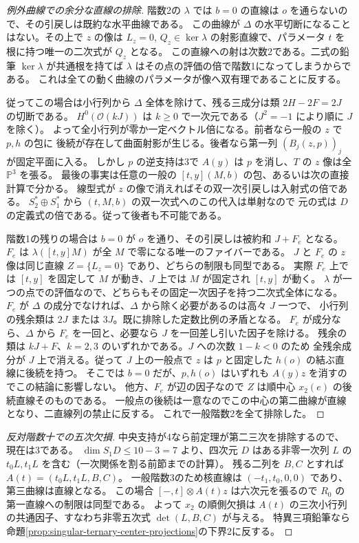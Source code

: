 \begin{proof}[例外曲線での余分な直線の排除]
階数2の $\lambda$ では $b=0$ の直線は $o$ を通らないので、その引戻しは既約な水平曲線である。
この曲線が $\Delta$ の水平切断になることはない。その上で $z$ の像は
$L_z=0$, $Q_z\in\ker\lambda$ の射影直線で、パラメータ $t$ を根に持つ唯一の二次式が $Q_z$ となる。
この直線への射は次数2である。二式の鉛筆 $\ker\lambda$ が共通根を持てば
$\lambda$ はその点の評価の倍で階数1になってしまうからである。
これは全ての動く曲線のパラメータが像へ双有理であることに反する。

従ってこの場合は小行列から $\Delta$ 全体を除けて、残る三成分は類 $2H-2F=2J$ の切断である。
$H^0(\mathcal O(kJ))$ は $k\ge0$ で一次元である（$J^2=-1$ により順に $J$ を除く）。
よって全小行列が零か一定ベクトル倍になる。前者なら一般の $z$ で $p,h$ の包に
後続が存在して曲面射影が生じる。後者なら第一列 $(B_j(z,p))_j$ が固定平面に入る。
しかし $p$ の逆支持は3で $A(y)$ は $p$ を消し、$T$ の $z$ 像は全 $\mathbb P^3$ を張る。
最後の事実は任意の一般の $[t,y](M,b)$ の包、あるいは次の直接計算で分かる。
線型式が $z$ の像で消えればその双一次引戻しは入射式の倍である。
$S_2^*\oplus S_1^*$ から $(t,M,b)$ の双一次式へのこの代入は単射なので
元の式は $D$ の定義式の倍である。従って後者も不可能である。

階数1の残りの場合は $b=0$ が $o$ を通り、その引戻しは被約和 $J+F_e$ となる。
$F_e$ は $\lambda([t,y]M)$ が全 $M$ で零になる唯一のファイバーである。
$J$ と $F_e$ の $z$ 像は同じ直線 $Z=\{L_z=0\}$ であり、どちらの制限も同型である。
実際 $F_e$ 上では $[t,y]$ を固定して $M$ が動き、$J$ 上では $M$ が固定され $[t,y]$ が動く。
$\lambda$ が一つの点での評価なので、どちらもその固定一次因子を持つ二次式全体になる。
$F_e$ が $\Delta$ の成分でなければ、$\Delta$ から除く必要があるのは高々 $J$ 一つで、
小行列の残余類は $2J$ または $3J$。既に排除した定数比例の矛盾となる。
$F_e$ が成分なら、$\Delta$ から $F_e$ を一回と、必要なら $J$ を一回差し引いた因子を除ける。
残余の類は $kJ+F$、$k=2,3$ のいずれかである。$J$ への次数 $1-k<0$ のため
全残余成分が $J$ 上で消える。従って $J$ 上の一般点で $z$ は $p$ と固定した $h(o)$ の結ぶ直線に後続を持つ。
そこでは $b=0$ だが、$p,h(o)$ はいずれも $A(y)z$ を消すのでこの結論に影響しない。
他方、$F_e$ が辺の因子なので $Z$ は順中心 $x_2(e)$ の後続直線そのものである。
一般点の後続は一意なのでこの中心の第二曲線が直線となり、二直線列の禁止に反する。
これで一般階数2を全て排除した。
\end{proof}
\begin{proof}[反対階数十での五次欠損]
中央支持が4なら前定理が第二三次を排除するので、現在は3である。
$\dim S_1D\le10-3=7$ より、四次元 $D$ はある非零一次列 $L$ の
$t_0 L,t_1 L$ を含む（一次関係を割る前節までの計算）。
残る二列を $B,C$ とすれば $A(t)=(t_0L,t_1L,B,C)$。
一般階数3のため核直線は $(-t_1,t_0,0,0)$ であり、第三曲線は直線となる。
この場合 $[-,t]\otimes A(t)z$ は六次元を張るので $R_0$ の第一直線への制限は同型である。
よって $x_2$ の順側欠損は $A(t)$ の三次小行列の共通因子、すなわち非零五次式 $\det(L,B,C)$ が与える。
特異三項鉛筆なら命題\ref{prop:singular-ternary-center-projections}の下界2に反する。
\end{proof}

